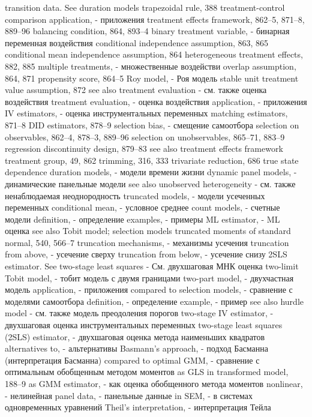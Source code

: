 transition data. See duration models 
trapezoidal rule, 388 treatment-control comparison
application, - приложения
treatment effects framework, 862–5, 871–8, 889–96
balancing condition, 864, 893–4
binary treatment variable, - бинарная переменная воздействия
conditional independence assumption, 863, 865 conditional mean independence assumption, 864 heterogeneous treatment effects, 882, 885 
multiple treatments, - множественные воздействи
overlap assumption, 864, 871
propensity score, 864–5
Roy model, - Роя модель
stable unit treatment value assumption, 872
see also treatment evaluation - см. также оценка воздействия
treatment evaluation, - оценка воздействия
application, - приложения
IV estimators, - оценка инструментальных переменных
matching estimators, 871–8
DID estimators, 878–9
selection bias, - смещение самоотбора
selection on observables, 862–4, 878–3, 889–96 selection on unobservables, 865–71, 883–9 regression discontinuity design, 879–83
see also treatment effects framework treatment group, 49, 862
trimming, 316, 333
trivariate reduction, 686
true state dependence
duration models, - модели времени жизни
dynamic panel models, - динамические панельные модели
see also unobserved heterogeneity - см. также ненаблюдаемая неоднородность
truncated models, - модели усеченных переменных
conditional mean, - условное среднее
count models, - счетные модели
definition, - определение
examples, - примеры
ML estimator, - ML оценка
see also Tobit model; selection models truncated moments of standard normal, 540, 566–7 truncation mechanisms, - механизмы усечения
truncation from above, - усечение сверху
truncation from below, - усечение снизу
2SLS estimator. See two-stage least squares - См. двухшаговая МНК оценка
two-limit Tobit model, - тобит модель с двумя границами
two-part model, - двухчастная модель
application, - приложения
compared to selection models, - сравнение с моделями самоотбора
definition, - определение
example, - пример
see also hurdle model - см. также модель преодоления порогов
two-stage IV estimator, - двухшаговая оценка инструментальных переменных
two-stage least squares (2SLS) estimator, - двухшаговая оценка метода наименьших квадратов
alternatives to, - альтернативы
Basmann’s approach, - подход Басманна (интерпретация Басманна)
compared to optimal GMM, - сравнение с оптимальным обобщенным методом моментов
as GLS in transformed model, 
188–9 
as GMM estimator, - как оценка обобщенного метода моментов
nonlinear, - нелинейная
panel data, - панельные данные
in SEM, - в системах одновременных уравнений
Theil’s interpretation, - интерпретация Тейла 
